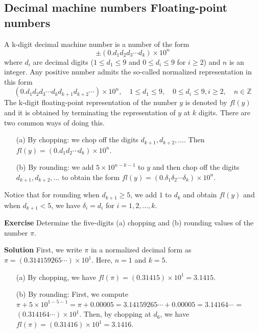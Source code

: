 \documentclass[main.tex]{subfiles}
\begin{document}
\subsection{Decimal machine numbers Floating-point numbers}
\par A k-digit decimal machine number is a number of the form 
\begin{equation}
    \pm (0.d_1 d_2 d_3 \cdots d_k) \times 10^n
\end{equation}
where $d_i$ are decimal digits ($1 \leq d_1 \leq 9$ and $0 \leq d_i \leq 9$ for $i \geq 2$) and $n$ is an integer. Any positive number admits the so-called normalized representation in this form
\begin{equation}
    (0.d_1 d_2 d_3 \cdots d_k d_{k + 1} d_{k + 2} \cdots) \times 10^n, \quad 1 \leq d_1 \leq 9, \quad 0 \leq d_i \leq 9, i \geq 2, \quad n \in \mathbb{Z}
\end{equation}
The k-digit floating-point representation of the number $y$ is denoted by $fl(y)$ and it is obtained by terminating the representation of $y$ at $k$ digits. There are two common ways of doing this. 

\begin{enumerate}
    \item[(a)] By chopping: we chop off the digits $d_{k+1}, d_{k+2}, \ldots$. Then $fl(y) = (0.d_1 d_2 \cdots d_k) \times 10^n$.
    \item[(b)] By rounding: we add $5 \times 10^{n - k - 1}$ to $y$ and then chop off the digits $d_{k+1}, d_{k+2}, \ldots$ to obtain the form 
    $fl(y) = (0.\delta_1 \delta_2 \cdots \delta_k) \times 10^n$.
\end{enumerate}
\par Notice that for rounding when $d_{k + 1} \ge 5$, we add $1$ to $d_k$ and obtain $fl(y)$ and when $d_{k + 1} < 5$, we have $\delta_i = d_i$ for $i = 1, 2, \ldots, k$. 

\par \noindent \textbf{Exercise} Determine the five-digits (a) chopping and (b) rounding values of the number $\pi$. 
\par \noindent \textbf{Solution} First, we write $\pi$ in a normalized decimal form as $\pi = (0.314159265\cdots) \times 10^1$. Here, $n = 1$ and $k = 5$. 
\begin{enumerate}
    \item [(a)] By chopping, we have $fl(\pi) = (0.31415) \times 10^1 = 3.1415$.
    \item [(b)] By rounding: First, we compute $\pi + 5 \times 10^{1 - 5 - 1} = \pi + 0.00005 = 3.14159265\cdots + 0.00005 = 3.14164\cdots$ = $(0.314164\cdots) \times 10^1$. Then, by chopping at $d_6$, we have $fl(\pi) = (0.31416) \times 10^1 = 3.1416$.
\end{enumerate}
\end{document}
